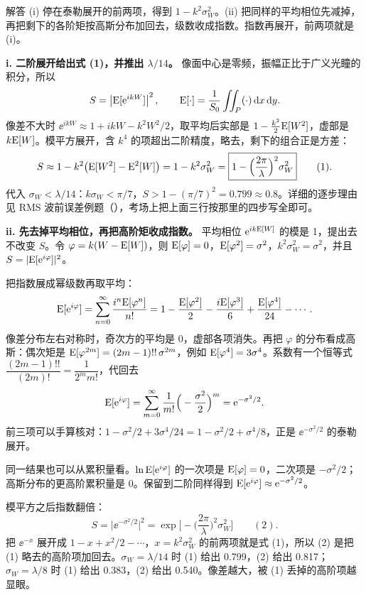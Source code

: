 \begin{exam}{解答}
(i) 停在泰勒展开的前两项，得到 $1-k^2\sigma_W^2$。(ii) 把同样的平均相位先减掉，再把剩下的各阶矩按高斯分布加回去，级数收成指数。指数再展开，前两项就是 (i)。

\textbf{i. 二阶展开给出式 (1)，并推出 $\lambda/14$。}
像面中心是零频，振幅正比于广义光瞳的积分，所以
\[
S=\left|\mathrm{E}[\mathrm{e}^{ikW}]\right|^2,\qquad
\mathrm{E}[\cdot]=\frac1{S_0}\iint_P(\cdot)\,\mathrm{d} x\,\mathrm{d} y .
\]
像差不大时 $\ee^{ikW}\approx1+ikW-k^2W^2/2$，取平均后实部是 $1-\frac{k^2}{2}\mathrm{E}[W^2]$，虚部是 $k\mathrm{E}[W]$。模平方展开，含 $k^4$ 的项超出二阶精度，略去，剩下的组合正是方差：
\[
S\approx1-k^2\big(\mathrm{E}[W^2]-\mathrm{E}^2[W]\big)=1-k^2\sigma_W^2
=\boxed{1-\Big(\frac{2\pi}{\lambda}\Big)^2\sigma_W^2}\qquad(1).
\]
代入 $\sigma_W<\lambda/14$：$k\sigma_W<\pi/7$，$S>1-(\pi/7)^2=0.799\approx0.8$。详细的逐步理由见 RMS 波前误差例题（\pageref{ex:v-strehl}），考场上把上面三行按那里的四步写全即可。

\textbf{ii. 先去掉平均相位，再把高阶矩收成指数。}
平均相位 $\mathrm{e}^{ik\mathrm{E}[W]}$ 的模是 1，提出去不改变 $S$。令 $\varphi=k(W-\mathrm{E}[W])$，则 $\mathrm{E}[\varphi]=0$，$\mathrm{E}[\varphi^2]=\sigma^2$，$k^2\sigma_W^2=\sigma^2$，并且 $S=|\mathrm{E}[\mathrm{e}^{i\varphi}]|^2$。

把指数展成幂级数再取平均：
\[
\mathrm{E}[\mathrm{e}^{i\varphi}]=\sum_{n=0}^{\infty}\frac{i^n\mathrm{E}[\varphi^n]}{n!}
=1-\frac{\mathrm{E}[\varphi^2]}{2}-\frac{i\mathrm{E}[\varphi^3]}{6}+\frac{\mathrm{E}[\varphi^4]}{24}-\cdots .
\]
像差分布左右对称时，奇次方的平均是 0，虚部各项消失。再把 $\varphi$ 的分布看成高斯：偶次矩是 $\mathrm{E}[\varphi^{2m}]=(2m-1)!!\,\sigma^{2m}$，例如 $\mathrm{E}[\varphi^4]=3\sigma^4$。系数有一个恒等式 $\dfrac{(2m-1)!!}{(2m)!}=\dfrac{1}{2^m m!}$，代回去
\[
\mathrm{E}[\mathrm{e}^{i\varphi}]=\sum_{m=0}^{\infty}\frac{1}{m!}\Big(-\frac{\sigma^2}{2}\Big)^m=\mathrm{e}^{-\sigma^2/2}.
\]
前三项可以手算核对：$1-\sigma^2/2+3\sigma^4/24=1-\sigma^2/2+\sigma^4/8$，正是 $\ee^{-\sigma^2/2}$ 的泰勒展开。

同一结果也可以从累积量看。$\ln\mathrm{E}[\mathrm{e}^{i\varphi}]$ 的一次项是 $\mathrm{E}[\varphi]=0$，二次项是 $-\sigma^2/2$；高斯分布的更高阶累积量是 0。保留到二阶同样得到 $\mathrm{E}[\mathrm{e}^{i\varphi}]\approx\mathrm{e}^{-\sigma^2/2}$。

模平方之后指数翻倍：
\[
S=\big|\ee^{-\sigma^2/2}\big|^2
=\boxed{\exp\Big[-\Big(\frac{2\pi}{\lambda}\Big)^2\sigma_W^2\Big]}\qquad(2).
\]
把 $\ee^{-x}$ 展开成 $1-x+x^2/2-\cdots$，$x=k^2\sigma_W^2$ 的前两项就是式 (1)，所以 (2) 是把 (1) 略去的高阶项加回去。$\sigma_W=\lambda/14$ 时 (1) 给出 0.799，(2) 给出 0.817；$\sigma_W=\lambda/8$ 时 (1) 给出 0.383，(2) 给出 0.540。像差越大，被 (1) 丢掉的高阶项越显眼。
\end{exam}


